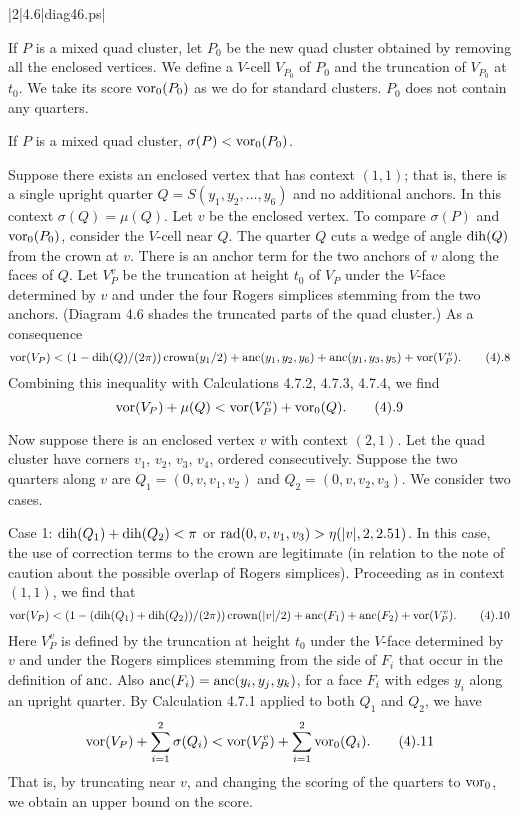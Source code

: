 \smallskip
\gram|2|4.6|diag46.ps|
\smallskip

\smallskip
If $P$ is a mixed quad cluster, let $P_0$ be the new quad cluster obtained
by removing all the enclosed vertices.  We define a $V$-cell $V_{P_0}$
of $P_0$ and the truncation of $V_{P_0}$ at $t_0$. We take its score
$\operatorname{vor}_0(P_0)$  as we do for standard clusters.  $P_0$ does
not contain any quarters.

  If $P$ is a mixed quad cluster,
$\sigma(P) < \operatorname{vor}_0(P_0)$.
\endproclaim

\bigskip
{}  Suppose there exists an enclosed vertex that
has context $(1,1)$; that is, there is a single upright quarter 
$Q=S(y_1,y_2,\ldots,y_6)$
and no additional anchors.  In this context $\sigma(Q)=\mu(Q)$.
Let $v$ be the enclosed vertex.  To compare $\sigma(P)$ and $\operatorname{vor}_0(P_0)$,
consider the $V$-cell near $Q$.
The quarter $Q$ cuts a wedge of angle $\operatorname{dih}(Q)$ from the crown at $v$.
There is an anchor term for the two anchors of $v$ along the faces
of $Q$.  Let $V_P^v$ be the truncation at height $t_0$ of $V_P$ under the
$V$-face determined by $v$ and under the four Rogers simplices stemming
from the two anchors.  (Diagram 4.6 shades the truncated parts of the
quad cluster.) As a consequence
$$\vor(V_P) <(1-\dih(Q)/(2\pi))\cro(y_1/2)+\anc(y_1,y_2,y_6)
+\anc(y_1,y_3,y_5) +\vor(V_P^v).\tag4.8$$
Combining this inequality with Calculations 4.7.2, 4.7.3, 4.7.4,
	we find
$$\vor(V_P) +\mu(Q) < \vor(V_P^v) +\vor_0(Q).\tag4.9$$

Now suppose there is an enclosed vertex $v$ with context $(2,1)$.
Let the quad cluster have corners $v_1$, $v_2$, $v_3$, $v_4$,
ordered consecutively.  Suppose the two quarters along $v$ are
$Q_1=(0,v,v_1,v_2)$ and $Q_2=(0,v,v_2,v_3)$.  We consider two
cases.

\noindent
Case 1:  $\operatorname{dih}(Q_1)+\operatorname{dih}(Q_2)<\pi$ or $\operatorname{rad}(0,v,v_1,v_3)>\eta(|v|,2,2.51)$.
In this case, the use of correction terms to the crown are
legitimate (in relation to the note of caution about
the possible overlap of Rogers simplices).  Proceeding as
in context $(1,1)$, we find that 
$$\vor(V_P) < (1-(\dih(Q_1)+\dih(Q_2))/(2\pi))\cro(|v|/2)
	+\anc(F_1) +\anc(F_2) +\vor(V_P^v).\tag4.10$$
Here $V_P^v$ is defined by the truncation at height $t_0$ 
 under the $V$-face determined by $v$ and
under the Rogers simplices stemming from the side of $F_i$ that
occur in the definition of $\operatorname{anc}$.
Also $\operatorname{anc}(F_i)=\operatorname{anc}(y_i,y_j,y_k)$, for a face $F_i$ with edges $y_i$
along an upright quarter.
   By Calculation 4.7.1 applied to both $Q_1$ and $Q_2$, we have
$$\vor(V_P) +\sum_{i=1}^2\sigma(Q_i) 
	< \vor(V_P^v) + \sum_{i=1}^2 \vor_0(Q_i).\tag4.11$$
That is, by truncating near $v$, and changing the scoring
of the quarters to $\operatorname{vor}_0$, we obtain an upper bound on the score.


